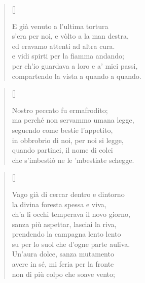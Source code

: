 \documentclass{article}
\begin{document}
\begin{verse}[\versewidth]
  \begin{patverse*}
    E già venuto a l'ultima tortura\\
    s'era per noi, e vòlto a la man destra,\\
    ed eravamo attenti ad altra cura.\\[10pt]
    e vidi spirti per la fiamma andando;\\
    per ch'io guardava a loro e a' miei passi,\\
    compartendo la vista a quando a quando.
  \end{patverse*}
\end{verse}

\begin{verse}[\versewidth]
  \begin{patverse*}
    Nostro peccato fu ermafrodito;\\
    ma perché non servammo umana legge,\\
    seguendo come bestie l'appetito,\\
    in obbrobrio di noi, per noi si legge,\\
    quando partinci, il nome di colei\\
    che s'imbestiò ne le 'mbestiate schegge.
  \end{patverse*}
\end{verse}

\begin{verse}[\versewidth]
  \begin{patverse*}
    Vago già di cercar dentro e dintorno\\
    la divina foresta spessa e viva,\\
    ch'a li occhi temperava il novo giorno,\\
    sanza più aspettar, lasciai la riva,\\
    prendendo la campagna lento lento\\
    su per lo suol che d'ogne parte auliva.\\
    Un'aura dolce, sanza mutamento\\
    avere in sé, mi feria per la fronte\\
    non di più colpo che soave vento;
  \end{patverse*}
\end{verse}
\end{document}
